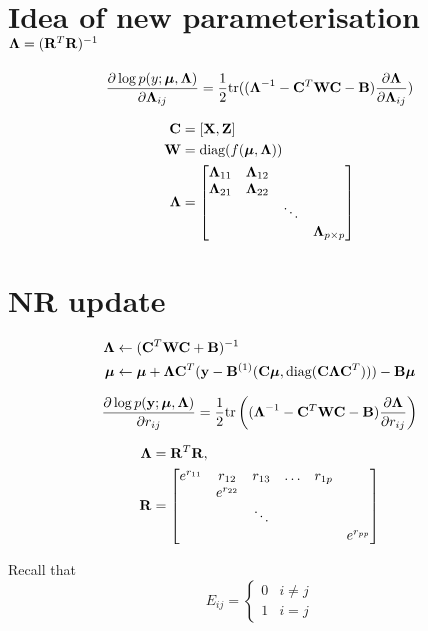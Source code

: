 \documentclass{article}[12pt]
\begin{document}
\section{Idea of new parameterisation ${\boldsymbol \Lambda} = ({\bf R}^T {\bf R})^{-1}$}
\begin{equation*}
\frac{\partial \log p(y;{\boldsymbol \mu}, {\boldsymbol \Lambda})}{\partial {\boldsymbol\Lambda}_{ij}} = {\frac{1}{2}} \text{tr} (({\boldsymbol \Lambda}^{-1} - {\bf C}^T {\bf W} {\bf C} - {\bf B})\frac{\partial {\boldsymbol\Lambda}}{\partial {\boldsymbol\Lambda}_{ij}})
\end{equation*}

\begin{align*}
{\bf C} &= [{\bf X}, {\bf Z}] \\
{\bf W} &= \text{diag}(f({\boldsymbol \mu}, {\boldsymbol \Lambda})) \\
{\boldsymbol \Lambda} &= \begin{bmatrix}
{\boldsymbol\Lambda}_{11} & {\boldsymbol \Lambda}_{12} &  &\\
{\boldsymbol \Lambda}_{21} & {\boldsymbol \Lambda}_{22} &  &\\
& & \ddots & \\
& & & {\boldsymbol \Lambda}_{p \times p}
\end{bmatrix}
\end{align*}

\section{NR update}
\begin{align*}
{\boldsymbol\Lambda} &\leftarrow ({\bf C}^T {\bf W} {\bf C} + {\bf B})^{-1} \\
{\boldsymbol \mu} &\leftarrow {\boldsymbol\mu} + {\boldsymbol \Lambda} {\bf C}^T ({\bf y} - {\bf B}^{(1)}({\bf C}{\boldsymbol \mu}, \text{diag} ({\bf C} {\boldsymbol \Lambda} {\bf C}^T))) - {\bf B} {\boldsymbol \mu}
\end{align*}

$$
\frac{\partial \log p ({\bf y};{\boldsymbol \mu}, {\boldsymbol \Lambda})}{\partial r_{ij}} = {\frac{1}{2}} \text{tr} \left (({\boldsymbol \Lambda}^{-1} - {\bf C}^T {\bf W} {\bf C} - {\bf B}) \frac{\partial {\boldsymbol\Lambda}}{\partial r_{ij}} \right )
$$

\begin{align*}
{\boldsymbol\Lambda} &= {\bf R}^T {\bf R}, \\
{\bf R} &= \begin{bmatrix}
e^{r_{11}} & r_{12} & r_{13} & \dots & r_{1p} \\
& e^{r_{22}} & & & & \\
&  & \ddots & & & \\
&  & & & & e^{r_{pp}}\\
\end{bmatrix}
\end{align*}

Recall that
$$E_{ij} =
\begin{cases}
0 & i \ne j \\
1 & i = j
\end{cases}
$$
\end{document}
